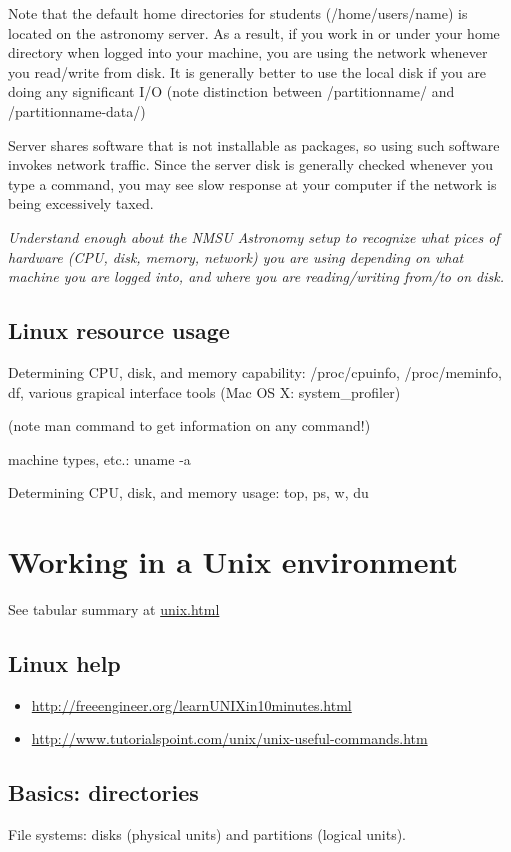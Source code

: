 \documentclass{article}
\newcommand{\test}[1]{%
    \begin{center}
        \colorbox{hl}{\parbox{0.9\textwidth}{\emph{#1}}}
    \end{center}}
\begin{document}
Note that the default home directories for students (/home/users/name)
is located on the astronomy server. As a result, if you work in or
under your home directory when logged into your machine, you are using
the network whenever you read/write from disk. It is generally better
to use the local disk if you are doing any significant I/O (note
distinction between /partitionname/ and /partitionname-data/)

Server shares software that is not installable as packages, so using
such software invokes network traffic. Since the server disk is
generally checked whenever you type a command, you may see slow
response at your computer if the network is being excessively taxed.

\test{Understand enough about the NMSU Astronomy setup to recognize
what pices of hardware (CPU, disk, memory, network) you are using
depending on what machine you are logged into, and where you are
reading/writing from/to on disk.}

\subsection{Linux resource usage}
Determining CPU, disk, and memory capability: /proc/cpuinfo,
/proc/meminfo, df, various grapical interface tools (Mac OS X:
system\_profiler)

(note man command to get information on any command!)

machine types, etc.: uname -a

Determining CPU, disk, and memory usage: top, ps, w, du

\section{Working in a Unix environment}
See tabular summary at \url{unix.html}

\subsection{Linux help}
\begin{itemize}
    \item \url{http://freeengineer.org/learnUNIXin10minutes.html}
    \item \url{http://www.tutorialspoint.com/unix/unix-useful-commands.htm}
\end{itemize}

\subsection{Basics: directories}
File systems: disks (physical units) and partitions (logical units).
\end{document}
